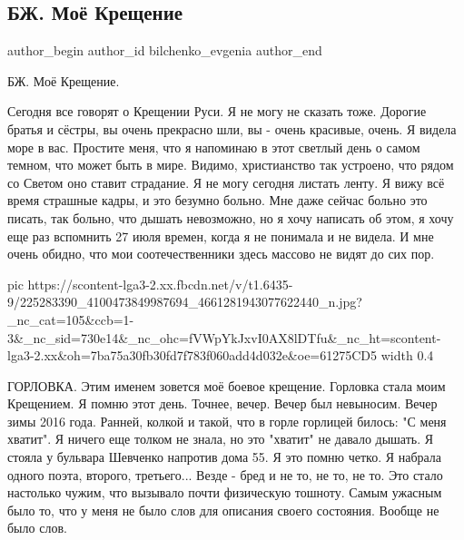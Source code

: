  
 
 
 
 
 
\subsection{БЖ. Моё Крещение}
\label{sec:27_07_2021.fb.bilchenko_evgenia.8.moje_kreschenie_gorlovka}
 
\ifcmt
 author_begin
   author_id bilchenko_evgenia
 author_end
\fi

БЖ. Моё Крещение.

Сегодня все говорят о Крещении Руси. Я не могу не сказать тоже. Дорогие братья
и сёстры, вы очень прекрасно шли, вы - очень красивые, очень. Я видела море в
вас. Простите меня, что я напоминаю в этот светлый день о самом темном, что
может быть в мире. Видимо, христианство так устроено, что рядом со Светом оно
ставит страдание. Я не могу сегодня листать ленту. Я вижу всё время страшные
кадры, и это безумно больно. Мне даже сейчас больно это писать, так больно, что
дышать невозможно, но я хочу написать об этом, я хочу еще раз вспомнить 27 июля
времен, когда я не понимала и не видела. И мне очень обидно, что мои
соотечественники здесь массово не видят до сих пор.

\ifcmt
  pic https://scontent-lga3-2.xx.fbcdn.net/v/t1.6435-9/225283390_4100473849987694_4661281943077622440_n.jpg?_nc_cat=105&ccb=1-3&_nc_sid=730e14&_nc_ohc=fVWpYkJxvI0AX8lDTfu&_nc_ht=scontent-lga3-2.xx&oh=7ba75a30fb30fd7f783f060add4d032e&oe=61275CD5
  width 0.4
\fi

ГОРЛОВКА. Этим именем зовется моё боевое крещение. Горловка стала моим
Крещением. Я помню этот день. Точнее, вечер. Вечер был невыносим. Вечер зимы
2016 года. Ранней, колкой и такой, что в горле горлицей билось: "С меня
хватит". Я ничего еще толком не знала, но это "хватит" не давало дышать. Я
стояла у бульвара Шевченко напротив дома 55. Я это помню четко. Я набрала
одного поэта, второго, третьего... Везде - бред и не то, не то, не то. Это
стало настолько чужим, что вызывало почти физическую тошноту. Самым ужасным
было то, что у меня не было слов для описания своего состояния. Вообще не было
слов.

